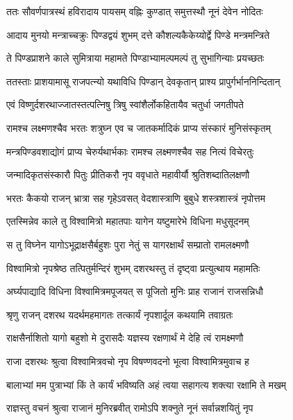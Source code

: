 \twolineshloka
{ततः सौवर्णपात्रस्थं हविरादाय पायसम्}
{वह्निः कुण्डात् समुत्तस्थौ नूनं देवेन नोदितः} %

\twolineshloka
{आदाय मुनयो मन्त्राच्चक्रुः पिण्डद्वयं शुभम्}
{दत्ते कौशल्यकैकेय्योर्द्वे पिण्डे मन्त्रमन्त्रिते} %

\twolineshloka
{ते पिण्डप्राशने काले सुमित्राया महामते}
{पिण्डाभ्यामल्पमल्पं तु सुभागिन्याः प्रयच्छतः} %

\twolineshloka
{ततस्ताः प्राशयामासू राजपत्न्यो यथाविधि}
{पिण्डान् देवकृतान् प्राश्य प्रापुर्गर्भाननिन्दितान्} %

\twolineshloka
{एवं विष्णुर्दशरथाज्जातस्तत्पत्निषु त्रिषु}
{स्वांशैर्लोकहितायैव चतुर्धा जगतीपते} %

\twolineshloka
{रामश्च लक्ष्मणश्चैव भरतः शत्रुघ्न एव च}
{जातकर्मादिकं प्राप्य संस्कारं मुनिसंस्कृतम्} %

\twolineshloka
{मन्त्रपिण्डवशाद्योगं प्राप्य चेरुर्यथार्भकाः}
{रामश्च लक्ष्मणश्चैव सह नित्यं विचेरतुः} %

\twolineshloka
{जन्मादिकृतसंस्कारौ पितुः प्रीतिकरौ नृप}
{ववृधाते महावीर्यौ श्रुतिशब्दातिलक्षणौ} %

\twolineshloka
{भरतः कैकयो राजन् भ्रात्रा सह गृहेऽवसत्}
{वेदशास्त्राणि बुबुधे शस्त्रशास्त्रं नृपोत्तम} %

\twolineshloka
{एतस्मिन्नेव काले तु विश्वामित्रो महातपाः}
{यागेन यष्टुमारेभे विधिना मधुसूदनम्} %

\twolineshloka
{स तु विघ्नेन यागोऽभूद्राक्षसैर्बहुशः पुरा}
{नेतुं स यागरक्षार्थं सम्प्रातो रामलक्ष्मणौ} %

\twolineshloka
{विश्वामित्रो नृपश्रेष्ठ तत्पितुर्मन्दिरं शुभम्}
{दशरथस्तु तं दृष्ट्वा प्रत्युत्थाय महामतिः} %

\twolineshloka
{अर्घ्यपाद्यादि विधिना विश्वामित्रमपूजयत्}
{स पूजितो मुनिः प्राह राजानं राजसन्निधौ} %

\twolineshloka
{श्रृणु राजन् दशरथ यदर्थमहमागतः}
{तत्कार्यं नृपशार्दूल कथयामि तवाग्रतः} %

\twolineshloka
{राक्षसैर्नाशितो यागो बहुशो मे दुरासदैः}
{यज्ञस्य रक्षणार्थं मे देहि त्वं रामक्ष्मणौ} %

\twolineshloka
{राजा दशरथः श्रुत्वा विश्वामित्रवचो नृप}
{विषण्णवदनो भूत्वा विश्वामित्रमुवाच ह} %

\twolineshloka
{बालाभ्यां मम पुत्राभ्यां किं ते कार्यं भविष्यति}
{अहं त्वया सहागत्य शक्त्या रक्षामि ते मखम्} %

\twolineshloka
{राज्ञस्तु वचनं श्रुत्वा राजानं मुनिरब्रवीत्}
{रामोऽपि शक्नुते नूनं सर्वान्नशयितुं नृप} %


